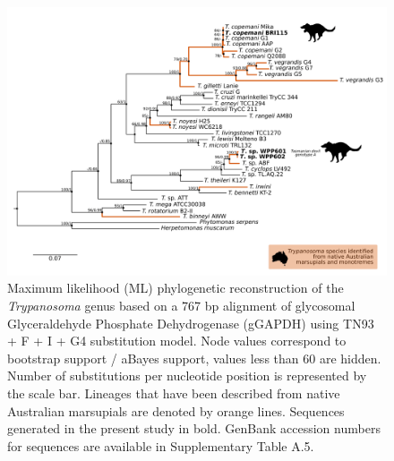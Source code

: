 \documentclass[a4paper, nobind]{templates/ociamthesis}
\begin{document}
\begin{figure}
\includegraphics[width=0.95\linewidth]{figures/ms-figs/Ch6-Fig3} \caption[Phylogenetic tree (GAPDH) of \textit{Trypanosoma} spp. from the Tasmanian devil.]{Maximum likelihood (ML) phylogenetic reconstruction of the \textit{Trypanosoma} genus based on a 767 bp alignment of glycosomal Glyceraldehyde Phosphate Dehydrogenase (gGAPDH) using TN93 + F + I + G4 substitution model. Node values correspond to bootstrap support / aBayes support, values less than 60 are hidden. Number of substitutions per nucleotide position is represented by the scale bar. Lineages that have been described from native Australian marsupials are denoted by orange lines. Sequences generated in the present study in bold. GenBank accession numbers for sequences are available in Supplementary Table A.5.}\label{fig:F63}
\end{figure}
\end{document}
